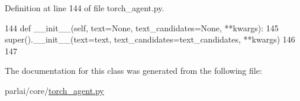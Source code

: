 Definition at line 144 of file torch\+\_\+agent.\+py.


\begin{DoxyCode}
144     \textcolor{keyword}{def }\_\_init\_\_(self, text=None, text\_candidates=None, **kwargs):
145         super().\_\_init\_\_(text=text, text\_candidates=text\_candidates, **kwargs)
146 
147 
\end{DoxyCode}


The documentation for this class was generated from the following file\+:\begin{DoxyCompactItemize}
\item 
parlai/core/\hyperlink{torch__agent_8py}{torch\+\_\+agent.\+py}\end{DoxyCompactItemize}
